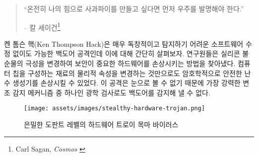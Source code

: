 \begin{quotation}\begin{samepage}
		\enquote{온전히 나의 힘으로 사과파이를 만들고 싶다면 먼저 우주를 발명해야 한다.}
		\begin{flushright} -- 칼 세이건\footnote{Carl Sagan, \textit{Cosmos} \cite{cosmos}}
\end{flushright}\end{samepage}\end{quotation}

\begin{comment}
	The Ken Thompson Hack is a particularly ingenious and hard-to-detect backdoor,
	so let's take a quick look at a hard-to-detect backdoor which works without
	modifying any software. Researchers found a way to compromise security-critical
	hardware by altering the polarity of silicon
	impurities.~\cite{becker2013stealthy} Just by changing the physical properties
	of the stuff that computer chips are made of they were able to compromise a
	cryptographically secure random number generator. Since this change can't be
	seen, the backdoor can't be detected by optical inspection, which is one of the
	most important tamper-detection mechanism for chips like these.
\end{comment}
켄 톰슨 핵(Ken Thompson Hack)은 매우 독창적이고 탐지하기 어려운 소프트웨어 수정 없이도 가능한 백도어 공격인데 이에 대해 간단히 살펴보자.
연구원들은 실리콘 불순물의 극성을 변경하여 보안이 중요한 하드웨어를 손상시키는 방법을 찾아냈다.\cite{becker2013stealthy}
컴퓨터 칩을 구성하는 재료의 물리적 속성을 변경하는 것만으로도 암호학적으로 안전한 난수 생성기를 손상시킬 수 있었다.
이 공격은 눈으로 볼 수 없기 때문에 가장 강력한 변조 감지 메커니즘 중 하나인 광학 검사로도 백도어를 감지해 낼 수 없다.

\begin{figure}
	\texttt{[image: assets/images/stealthy-hardware-trojan.png]}
	\caption{은밀한 도판트 레벨의 하드웨어 트로이 목마 바이러스}
	\label{fig:stealthy-hardware-trojan}
\end{figure}


